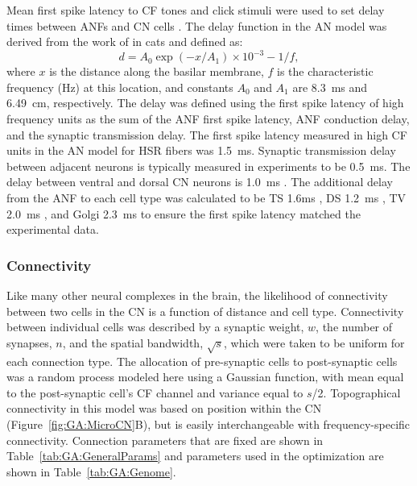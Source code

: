 Mean first spike latency to CF tones and click stimuli were used to
set delay times between ANFs and CN cells
\citep{EagerGraydenEtAl:2006}. The delay function in the AN model was
derived from the work of \citet{CarneyYin:1988} in cats and
defined as:
\begin{equation} \label{eq:GA:13} 
d=A_{0} \exp(-x/A_{1})\times 10^{- 3} -1/f,
\end{equation}
where $x$ is the distance along the basilar membrane, $f$ is the
characteristic frequency (Hz) at this location, and constants $A_0$
and $A_1$ are 8.3~ms and 6.49~cm, respectively. The delay was defined
using the first spike latency of high frequency units as the sum of
the ANF first spike latency, ANF conduction delay, and the synaptic
transmission delay.  The first spike latency measured in high CF units
in the AN model for HSR fibers was 1.5~ms.  Synaptic transmission
delay between adjacent neurons is typically measured in experiments to
be 0.5~ms. The delay between ventral and dorsal CN neurons is 1.0~ms
\citep{WickesbergOertel:1993}.  The additional delay from the ANF to
each cell type was calculated to be TS 1.6ms \citep{RhodeSmith:1986},
DS 1.2~ms \citep{RhodeOertelEtAl:1983}, TV 2.0~ms
\citep{SpirouDavisEtAl:1999}, and Golgi 2.3~ms
\citep{FerragamoGoldingEtAl:1998a} to ensure the first spike latency
matched the experimental data.

\subsubsection{Connectivity}\label{sec:GA:connectivity}

Like many other neural complexes in the brain, the likelihood of
connectivity between two cells in the CN is a function of distance and
cell type. Connectivity between individual cells was described by a
synaptic weight, $w$, the number of synapses, $n$, and the spatial
bandwidth, $\sqrt{s} $, which were taken to be uniform for each
connection type.  The allocation of pre-synaptic cells to
post-synaptic cells was a random process modeled here using a Gaussian
function, with mean equal to the post-synaptic cell's CF channel and
variance equal to $s$/2. Topographical connectivity in this model was
based on position within the CN (Figure~\ref{fig:GA:MicroCN}B), but is easily
interchangeable with frequency-specific connectivity.  Connection
parameters that are fixed are shown in Table~\ref{tab:GA:GeneralParams} and
parameters used in the optimization are shown in Table~\ref{tab:GA:Genome}.

